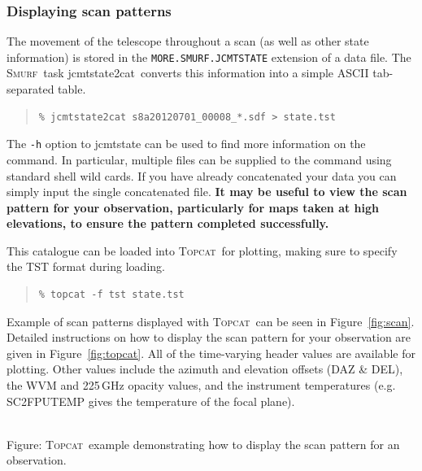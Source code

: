 \documentclass[twoside,11pt]{article}
\newcommand{\htmladdnormallink}[2]{#1}
\newcommand{\htmladdimg}[1]{}
\newcommand{\htmlref}[2]{#1}
\newcommand{\latexhtml}[2]{#1}
\newcommand{\xref}[3]{#1}
\newcommand{\xlabel}[1]{}
\renewcommand{\_}{\texttt{\symbol{95}}}
\newenvironment{myquote}{\begin{quote}\begin{small}}{\end{small}\end{quote}}
\newcommand{\smurf}{\xref{\textsc{Smurf}}{sun258}{}}
\newcommand{\topcat}{\htmladdnormallink{\textsc{Topcat}}{http://www.starlink.ac.uk/topcat}}
\newcommand{\task}[1]{\textsf{#1}}
\newcommand{\jcmtstate}{\xref{\task{jcmtstate2cat}}{sun258}{JCMTSTATE2CAT}}
\newcommand{\cref}[3]{\latexhtml{#1~\ref{#2}}{\htmlref{#3}{#2}}}
\begin{document}
\subsubsection{\xlabel{scan_pat}Displaying scan patterns}
\label{sec:scan}

The movement of the telescope throughout a scan (as well as other
state information) is stored in the \texttt{MORE.SMURF.JCMTSTATE}
extension of a data file. The \smurf\ task \jcmtstate\ converts this
information into a simple ASCII tab-separated table.

\begin{myquote}
\begin{verbatim}
% jcmtstate2cat s8a20120701_00008_*.sdf > state.tst
\end{verbatim}
\end{myquote}

The \texttt{-h} option to \task{jcmtstate} can be used to find more
information on the command. In particular, multiple files can be supplied
to the command using standard shell wild cards. If you have already
concatenated your data you can simply input the single concatenated
file. \textbf{It may be useful to view the scan pattern for your
observation, particularly for maps taken at high elevations, to ensure
the pattern completed successfully.}

This catalogue can be loaded into \topcat\ for plotting, making sure
to specify the TST format during loading.

\begin{myquote}
\begin{verbatim}
% topcat -f tst state.tst
\end{verbatim}
\end{myquote}

Example of scan patterns displayed with \topcat\ can be seen in
\cref{Figure}{fig:scan}{telescope tracks}. Detailed instructions on
how to display the scan pattern for your observation are given in
\cref{Figure}{fig:topcat}{box below}.
All of the time-varying header values are available for plotting. Other
values include the azimuth and elevation offsets (DAZ \& DEL), the WVM
and 225\,GHz opacity values, and the instrument temperatures (e.g.
SC2\_FPUTEMP gives the temperature of the focal plane).

\begin{htmlonly}
 \label{fig:topcat} \htmladdimg{sc21_topcat_example.png}
 \\
 Figure: \topcat\ example demonstrating how to display the scan
 pattern for an observation.\\ \\
\end{htmlonly}
\end{document}
